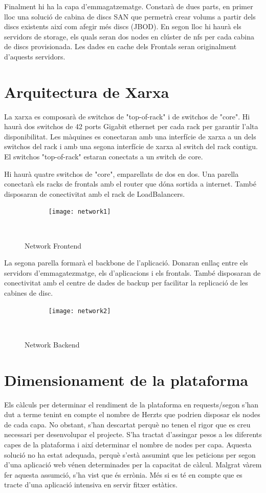 \documentclass[a4paper, 11pt]{article}
\begin{document}
Finalment hi ha la capa d'emmagatzematge. Constarà de dues parts, en primer lloc una solució de cabina de discs SAN que permetrà crear volums a partir dels discs existents així com afegir més discs (JBOD). En segon lloc hi haurà els servidors de storage, els quals seran dos nodes en clúster de nfs per cada cabina de discs provisionada. Les dades en cache dels Frontals seran originalment d'aquests servidors.


\section{Arquitectura de Xarxa}

La xarxa es composarà de switchos de "top-of-rack" i de switchos de "core". Hi haurà dos switchos de 42 ports Gigabit ethernet per cada rack per garantir l'alta disponibilitat. Les màquines es conectaran amb una interfície de xarxa a un dels switchos del rack i amb una segona interfície de xarxa al switch del rack contigu. El switchos "top-of-rack" estaran conectats a un switch de core. 

Hi haurà quatre switchos de "core", emparellats de dos en dos. Una parella conectarà els racks de frontals amb el router que dóna sortida a internet. També disposaran de conectivitat amb el rack de LoadBalancers. 

\begin{figure}[H]
    \centering
    \texttt{[image: network1]}
    \caption{Network Frontend \label{fig:centralized}}    
\end{figure}


La segona parella formarà el backbone de l'aplicació. Donaran enllaç entre els servidors d'emmagatezmatge, els d'aplicacions i els frontals. També disposaran de conectivitat amb el centre de dades de backup per facilitar la replicació de les cabines de disc. 

\begin{figure}[H]
    \centering
    \texttt{[image: network2]}
    \caption{Network Backend \label{fig:centralized}}    
\end{figure}

\section{Dimensionament de la plataforma}

Els càlculs per determinar el rendiment de la plataforma en requests/segon s'han dut a terme tenint en compte el nombre de Herzts que podrien disposar els nodes de cada capa. No obstant, s'han descartat perquè no tenen el rigor que es creu necessari per desenvolupar el projecte. 
S'ha tractat d'assingar pesos a les diferents capes de la plataforma i així determinar el nombre de nodes per capa. Aquesta solució no ha estat adequada, perquè s'està assumint que les peticions per segon d'una aplicació web vénen determinades per la capacitat de càlcul. Malgrat vàrem fer aquesta assumció, s'ha vist que és errònia. Més si es té en compte que es tracte d'una aplicació intensiva en servir fitxer estàtics.
\end{document}
